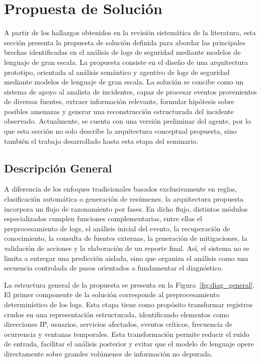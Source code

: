 \chapter{Propuesta de Solución}

A partir de los hallazgos obtenidos en la revisión sistemática de la literatura, esta sección presenta la propuesta de solución definida para abordar las principales brechas identificadas en el análisis de logs de seguridad mediante modelos de lenguaje de gran escala. La propuesta consiste en el diseño de una arquitectura prototipo, orientada al análisis semántico y agentivo de logs de seguridad mediante modelos de lenguaje de gran escala. La solución se concibe como un sistema de apoyo al analista de incidentes, capaz de procesar eventos provenientes de diversas fuentes, extraer información relevante, formular hipótesis sobre posibles amenazas y generar una reconstrucción estructurada del incidente observado. Actualmente, se cuenta con una versión preliminar del agente, por lo que esta sección no solo describe la arquitectura conceptual propuesta, sino también el trabajo desarrollado hasta esta etapa del seminario.

\section{Descripción General}

A diferencia de los enfoques tradicionales basados exclusivamente en reglas, clasificación automática o generación de resúmenes, la arquitectura propuesta incorpora un flujo de razonamiento por fases. En dicho flujo, distintos módulos especializados cumplen funciones complementarias, entre ellas el preprocesamiento de logs, el análisis inicial del evento, la recuperación de conocimiento, la consulta de fuentes externas, la generación de mitigaciones, la validación de acciones y la elaboración de un reporte final. Así, el sistema no se limita a entregar una predicción aislada, sino que organiza el análisis como una secuencia controlada de pasos orientados a fundamentar el diagnóstico.


La estructura general de la propuesta se presenta en la Figura~\ref{fig:diag_general}. El primer componente de la solución corresponde al preprocesamiento determinístico de los logs. Esta etapa tiene como propósito transformar registros crudos en una representación estructurada, identificando elementos como direcciones IP, usuarios, servicios afectados, eventos críticos, frecuencia de ocurrencia y ventanas temporales. Esta transformación permite reducir el ruido de entrada, facilitar el análisis posterior y evitar que el modelo de lenguaje opere directamente sobre grandes volúmenes de información no depurada.

